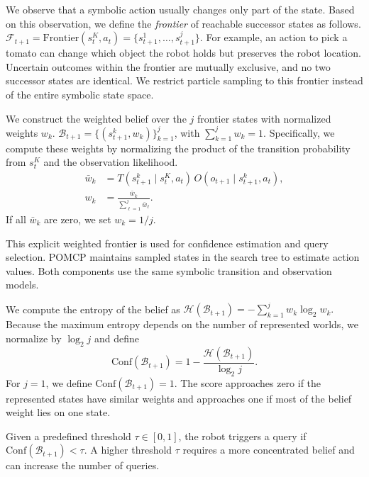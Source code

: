 We observe that a symbolic action usually changes only part of the state. Based on this observation, we define the \textit{frontier} of reachable successor states as follows.
$\mathcal{F}_{t+1} = \mathrm{Frontier}(s_t^{K},a_t) = \{s_{t+1}^{1},\ldots,s_{t+1}^{j}\}.$
For example, an action to pick a tomato can change which object the robot holds but preserves the robot location. Uncertain outcomes within the frontier are mutually exclusive, and no two successor states are identical. We restrict particle sampling to this frontier instead of the entire symbolic state space.

We construct the weighted belief over the $j$ frontier states with normalized weights $w_k$.
$\mathcal{B}_{t+1}=\{(s_{t+1}^{k},w_k)\}_{k=1}^{j}$, with $\sum_{k=1}^{j}w_k=1.$
Specifically, we compute these weights by normalizing the product of the transition probability from $s_t^{K}$ and the observation likelihood.
\begin{equation}
\begin{aligned}
\bar{w}_{k}
&=T(s_{t+1}^{k}\mid s_t^{K},a_t)\,
O(o_{t+1}\mid s_{t+1}^{k},a_t),\\
w_k&=\frac{\bar{w}_k}{\sum_{\ell=1}^{j}\bar{w}_{\ell}}.
\end{aligned}
\label{eq:belief_update}
\end{equation}
If all $\bar{w}_k$ are zero, we set $w_k=1/j$.

This explicit weighted frontier is used for confidence estimation and query selection. POMCP maintains sampled states in the search tree to estimate action values. Both components use the same symbolic transition and observation models.

We compute the entropy of the belief as
$\mathcal{H}(\mathcal{B}_{t+1}) = -\sum_{k=1}^{j}w_k\log_2 w_k.$
Because the maximum entropy depends on the number of represented worlds, we normalize by $\log_2 j$ and define
\begin{equation}
\mathrm{Conf}(\mathcal{B}_{t+1}) = 1-\frac{\mathcal{H}(\mathcal{B}_{t+1})}{\log_2 j}.
\label{eq:compute_confidence}
\end{equation}
For $j=1$, we define $\mathrm{Conf}(\mathcal{B}_{t+1})=1$. The score approaches zero if the represented states have similar weights and approaches one if most of the belief weight lies on one state.

Given a predefined threshold $\tau\in[0,1]$, the robot triggers a query if
$\mathrm{Conf}(\mathcal{B}_{t+1})<\tau.$
A higher threshold $\tau$ requires a more concentrated belief and can increase the number of queries.

